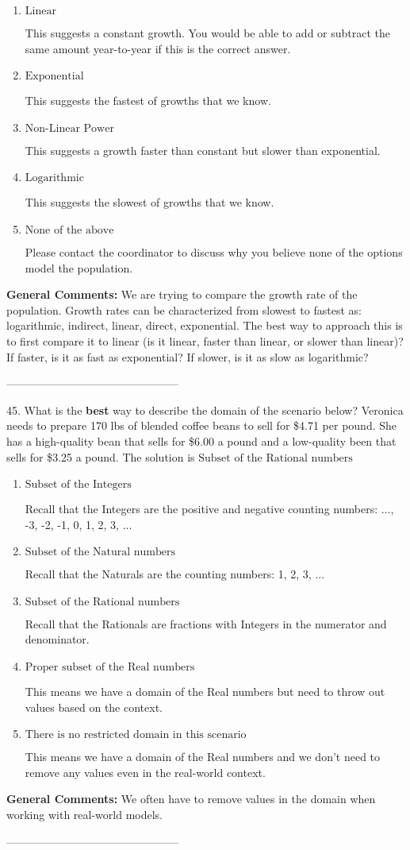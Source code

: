 \documentclass{extbook}[14pt]
\begin{document}
\begin{enumerate}[label=\Alph*.] 
\item $ \text{Linear} $ 

 This suggests a constant growth. You would be able to add or subtract the same amount year-to-year if this is the correct answer. 
\item $ \text{Exponential} $ 

 This suggests the fastest of growths that we know. 
\item $ \text{Non-Linear Power} $ 

 This suggests a growth faster than constant but slower than exponential. 
\item $ \text{Logarithmic} $ 

 This suggests the slowest of growths that we know. 
\item $ \text{None of the above} $ 

 Please contact the coordinator to discuss why you believe none of the options model the population. 
\end{enumerate} 
 
\textbf{General Comments:} We are trying to compare the growth rate of the population. Growth rates can be characterized from slowest to fastest as: logarithmic, indirect, linear, direct, exponential. The best way to approach this is to first compare it to linear (is it linear, faster than linear, or slower than linear)? If faster, is it as fast as exponential? If slower, is it as slow as logarithmic?

-----------------------------------------------

45. What is the \textbf{best} way to describe the domain of the scenario below?
Veronica needs to prepare 170 lbs of blended coffee beans to sell for \$4.71 per pound. She has a high-quality bean that sells for \$6.00 a pound and a low-quality been that sells for \$3.25 a pound. 
The solution is $ \text{Subset of the Rational numbers} $ 

\begin{enumerate}[label=\Alph*.] 
\item $ \text{Subset of the Integers} $ 

 Recall that the Integers are the positive and negative counting numbers: ..., -3, -2, -1, 0, 1, 2, 3, ...  
\item $ \text{Subset of the Natural numbers} $ 

 Recall that the Naturals are the counting numbers: 1, 2, 3, ... 
\item $ \text{Subset of the Rational numbers} $ 

 Recall that the Rationals are fractions with Integers in the numerator and denominator. 
\item $ \text{Proper subset of the Real numbers} $ 

 This means we have a domain of the Real numbers but need to throw out values based on the context. 
\item $ \text{There is no restricted domain in this scenario} $ 

 This means we have a domain of the Real numbers and we don't need to remove any values even in the real-world context. 
\end{enumerate} 
 
\textbf{General Comments:} We often have to remove values in the domain when working with real-world models.

-----------------------------------------------
\end{document}
